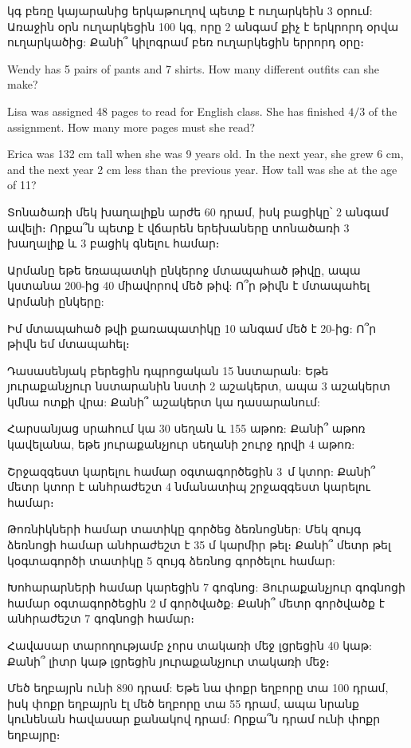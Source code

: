  կգ բեռը կայարանից երկաթուղով պետք է 
ուղարկեին 3 օրում: Առաջին օրն ուղարկեցին 100 կգ, որը 
2 անգամ քիչ է երկրորդ օրվա ուղարկածից: Քանի՞ կիլոգրամ 
բեռ ուղարկեցին երրորդ օրը։

\textproblem Wendy has 5 pairs of pants and 7 
shirts. How many different outfits can she make?

\textproblem Lisa was assigned 48 pages to read 
for English class. She has finished $4/3$ of
the assignment. How many more pages must she read?



\textproblem Erica was 132 cm tall when she was 9 years 
old. In the next year, she grew 6 cm, and the next year 
2 cm less than the previous year. How tall was she at 
the age of 11?

\bye


\problem
Տոնածառի մեկ խաղալիքն արժե 60 դրամ, իսկ բացիկը՝ 2 
անգամ ավելի։ Որքա՞ն պետք է վճարեն երեխաները տոնածառի 
3 խաղալիք և 3 բացիկ գնելու համար։

\problem
Արմանը եթե եռապատկի ընկերոջ մտապահած թիվը, ապա կստանա 
200-ից 40 միավորով մեծ թիվ: Ո՞ր թիվն է մտապահել Արմանի 
ընկերը:

\problem
Իմ մտապահած թվի քառապատիկը 10 անգամ մեծ է 20-ից: Ո՞ր 
թիվն եմ մտապահել։

\problem
Դասասենյակ բերեցին դպրոցական 15 նստարան: Եթե յուրաքանչյուր 
նստարանին նստի 2 աշակերտ, ապա 3 աշակերտ կմնա ոտքի վրա: 
Քանի՞ աշակերտ կա դասարանում:

\problem
Հարսանյաց սրահում կա 30 սեղան և 155 աթոռ: Քանի՞ աթոռ 
կավելանա, եթե յուրաքանչյուր սեղանի շուրջ դրվի 4 աթոռ:


\problem
Շրջազգեստ կարելու համար օգտագործեցին 3~մ կտոր: Քանի՞ 
մետր կտոր է անհրաժեշտ 4 նմանատիպ շրջազգեստ կարելու համար։

\problem
Թոռնիկների համար տատիկը գործեց ձեռնոցներ: Մեկ զույգ 
ձեռնոցի համար անհրաժեշտ է 35 մ կարմիր թել։ Քանի՞ մետր 
թել կօգտագործի տատիկը 5 զույգ ձեռնոց գործելու համար:

\problem
Խոհարարների համար կարեցին 7 գոգնոց: Յուրաքանչյուր 
գոգնոցի համար օգտագործեցին 2 մ գործվածք: Քանի՞ մետր 
գործվածք է անհրաժեշտ 7 գոգնոցի համար։

\problem
Հավասար տարողությամբ չորս տակառի մեջ լցրեցին 40 կաթ: 
Քանի՞ լիտր կաթ լցրեցին յուրաքանչյուր տակառի մեջ։

\problem
Մեծ եղբայրն ունի 890 դրամ: Եթե նա փոքր եղբորը տա 100 դրամ, 
իսկ փոքր եղբայրն էլ մեծ եղբորը տա 55 դրամ, ապա նրանք կունենան 
հավասար քանակով դրամ: Որքա՞ն դրամ ունի փոքր եղբայրը։

